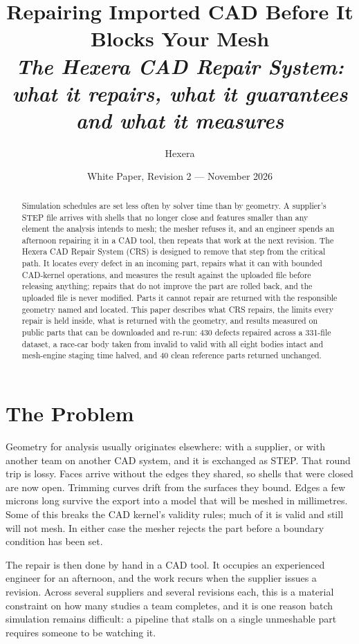 \documentclass[10pt,onecolumn]{article}
\title{\vspace{-1.3cm}\bfseries Repairing Imported CAD Before It Blocks Your Mesh\\[0.2em]
       \large\normalfont\itshape The Hexera CAD Repair System: what it repairs, what it guarantees
       and what it measures}
\author{Hexera}
\date{White Paper, Revision 2 --- November 2026}
\begin{document}
\maketitle
\thispagestyle{plain}

\begin{abstract}
\noindent
Simulation schedules are set less often by solver time than by geometry. A supplier's STEP file
arrives with shells that no longer close and features smaller than any element the analysis
intends to mesh; the mesher refuses it, and an engineer spends an afternoon repairing it in a CAD
tool, then repeats that work at the next revision. The Hexera CAD Repair System (CRS) is designed
to remove that step from the critical path. It locates every defect in an incoming part, repairs
what it can with bounded CAD-kernel operations, and measures the result against the uploaded file
before releasing anything; repairs that do not improve the part are rolled back, and the uploaded
file is never modified. Parts it cannot repair are returned with the responsible geometry named
and located. This paper describes what CRS repairs, the limits every repair is held inside, what
is returned with the geometry, and results measured on public parts that can be downloaded and
re-run: 430 defects repaired across a 331-file dataset, a race-car body taken from invalid to
valid with all eight bodies intact and mesh-engine staging time halved, and 40 clean reference
parts returned unchanged.
\end{abstract}

\section{The Problem}

Geometry for analysis usually originates elsewhere: with a supplier, or with another team on
another CAD system, and it is exchanged as STEP. That round trip is lossy. Faces arrive without
the edges they shared, so shells that were closed are now open. Trimming curves drift from the
surfaces they bound. Edges a few microns long survive the export into a model that will be meshed
in millimetres. Some of this breaks the CAD kernel's validity rules; much of it is valid and still
will not mesh. In either case the mesher rejects the part before a boundary condition has been
set.

The repair is then done by hand in a CAD tool. It occupies an experienced engineer for an
afternoon, and the work recurs when the supplier issues a revision. Across several suppliers and
several revisions each, this is a material constraint on how many studies a team completes, and it
is one reason batch simulation remains difficult: a pipeline that stalls on a single unmeshable
part requires someone to be watching it.
\end{document}
